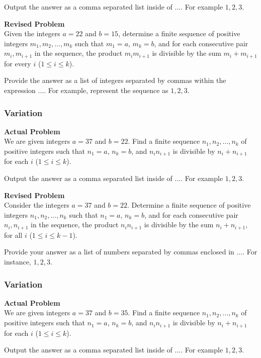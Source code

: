 Output the answer as a comma separated list inside of $\boxed{...}$. For example $\boxed{1, 2, 3}$.

\textbf{Revised Problem}\\
Given the integers $a = 22$ and $b = 15$, determine a finite sequence of positive integers $m_1, m_2, \ldots, m_k$ such that $m_1 = a$, $m_k = b$, and for each consecutive pair $m_i, m_{i+1}$ in the sequence, the product $m_im_{i+1}$ is divisible by the sum $m_i + m_{i+1}$ for every $i$ ($1 \le i \le k$).

Provide the answer as a list of integers separated by commas within the expression $\boxed{...}$. For example, represent the sequence as $\boxed{1, 2, 3}$.

\subsubsection{Variation}
\textbf{Actual Problem}\\
We are given integers $a = 37$ and $b = 22$. Find a finite sequence $n_1, n_2, \ldots, n_k$ of positive integers such that $n_1 = a$, $n_k = b$, and $n_in_{i+1}$ is divisible by $n_i + n_{i+1}$ for each $i$ ($1 \le i \le k$).

Output the answer as a comma separated list inside of $\boxed{...}$. For example $\boxed{1, 2, 3}$.

\textbf{Revised Problem}\\
Consider the integers $a = 37$ and $b = 22$. Determine a finite sequence of positive integers $n_1, n_2, \ldots, n_k$ such that $n_1 = a$, $n_k = b$, and for each consecutive pair $n_i, n_{i+1}$ in the sequence, the product $n_in_{i+1}$ is divisible by the sum $n_i + n_{i+1}$, for all $i$ ($1 \le i \le k-1$).

Provide your answer as a list of numbers separated by commas enclosed in $\boxed{...}$. For instance, $\boxed{1, 2, 3}$.

\subsubsection{Variation}
\textbf{Actual Problem}\\
We are given integers $a = 37$ and $b = 35$. Find a finite sequence $n_1, n_2, \ldots, n_k$ of positive integers such that $n_1 = a$, $n_k = b$, and $n_in_{i+1}$ is divisible by $n_i + n_{i+1}$ for each $i$ ($1 \le i \le k$).

Output the answer as a comma separated list inside of $\boxed{...}$. For example $\boxed{1, 2, 3}$.

